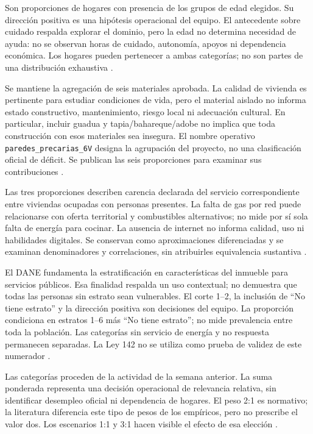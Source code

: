 \begin{description}[leftmargin=1.27cm,style=nextline]
\item[1HM y 2HM: composición del hogar y cuidado potencial.] Son proporciones de hogares con presencia de los grupos de edad elegidos. Su dirección positiva es una hipótesis operacional del equipo. El antecedente sobre cuidado respalda explorar el dominio, pero la edad no determina necesidad de ayuda: no se observan horas de cuidado, autonomía, apoyos ni dependencia económica. Los hogares pueden pertenecer a ambas categorías; no son partes de una distribución exhaustiva \citep{dnp2023icvu,dane2021cnpv}.
\item[6V: composición material de las paredes.] Se mantiene la agregación de seis materiales aprobada. La calidad de vivienda es pertinente para estudiar condiciones de vida, pero el material aislado no informa estado constructivo, mantenimiento, riesgo local ni adecuación cultural. En particular, incluir guadua y tapia/bahareque/adobe no implica que toda construcción con esos materiales sea insegura. El nombre operativo \texttt{paredes\_precarias\_6V} designa la agrupación del proyecto, no una clasificación oficial de déficit. Se publican las seis proporciones para examinar sus contribuciones \citep{dane2021cnpv,dnp2023icvu}.
\item[Energía, gas e internet (8V): acceso diferenciado.] Las tres proporciones describen carencia declarada del servicio correspondiente entre viviendas ocupadas con personas presentes. La falta de gas por red puede relacionarse con oferta territorial y combustibles alternativos; no mide por sí sola falta de energía para cocinar. La ausencia de internet no informa calidad, uso ni habilidades digitales. Se conservan como aproximaciones diferenciadas y se examinan denominadores y correlaciones, sin atribuirles equivalencia sustantiva \citep{dane2021cnpv}.
\item[10V: clasificación socioeconómica asociada al inmueble.] El DANE fundamenta la estratificación en características del inmueble para servicios públicos. Esa finalidad respalda un uso contextual; no demuestra que todas las personas sin estrato sean vulnerables. El corte 1--2, la inclusión de \enquote{No tiene estrato} y la dirección positiva son decisiones del equipo. La proporción condiciona en estratos 1--6 más \enquote{No tiene estrato}; no mide prevalencia entre toda la población. Las categorías sin servicio de energía y no respuesta permanecen separadas. La Ley 142 no se utiliza como prueba de validez de este numerador \citep{dane_estratificacion}.
\item[5PM: puntuación experimental de actividad de población 10+.] Las categorías proceden de la actividad de la semana anterior. La suma ponderada representa una decisión operacional de relevancia relativa, sin identificar desempleo oficial ni dependencia de hogares. El peso 2:1 es normativo; la literatura diferencia este tipo de pesos de los empíricos, pero no prescribe el valor dos. Los escenarios 1:1 y 3:1 hacen visible el efecto de esa elección \citep{dane_5pm,decancq2013weights}.
\end{description}

